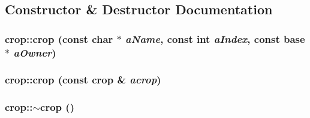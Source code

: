 \subsection{Constructor \& Destructor Documentation}
\hypertarget{classcrop_a852f1319f017379280a1604a1bbddf0e}{
\subsubsection[{crop}]{\setlength{\rightskip}{0pt plus 5cm}crop::crop (const char $\ast$ {\em aName}, \/  const int {\em aIndex}, \/  const {\bf base} $\ast$ {\em aOwner})}}
\label{classcrop_a852f1319f017379280a1604a1bbddf0e}
\hypertarget{classcrop_ae21f526e78ac3bcfe9f71a58d785b7bf}{
\subsubsection[{crop}]{\setlength{\rightskip}{0pt plus 5cm}crop::crop (const {\bf crop} \& {\em acrop})}}
\label{classcrop_ae21f526e78ac3bcfe9f71a58d785b7bf}
\hypertarget{classcrop_a87d279e2be25081212cf17871c177388}{
\subsubsection[{$\sim$crop}]{\setlength{\rightskip}{0pt plus 5cm}crop::$\sim$crop ()}}
\label{classcrop_a87d279e2be25081212cf17871c177388}


